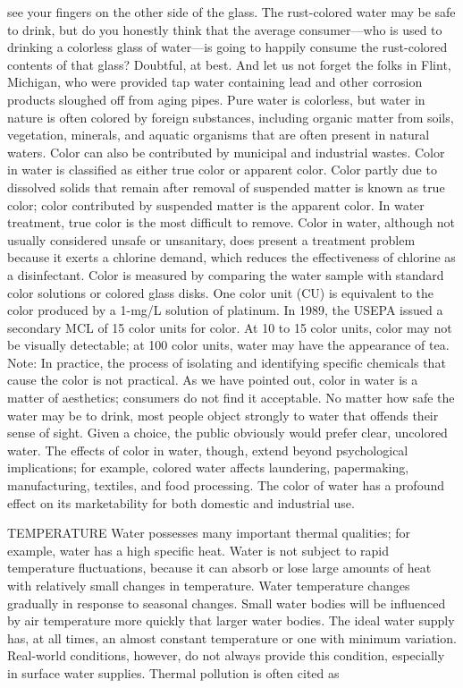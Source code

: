 \documentclass{article}
\begin{document}
see your fingers on the other side of the glass. The rust-colored water
may be safe to drink, but do you honestly think that the average
consumer---who is used to drinking a colorless glass of water---is going
to happily consume the rust-colored contents of that glass? Doubtful, at
best. And let us not forget the folks in Flint, Michigan, who were
provided tap water containing lead and other corrosion products sloughed
off from aging pipes. Pure water is colorless, but water in nature is
often colored by foreign substances, including organic matter from
soils, vegetation, minerals, and aquatic organisms that are often
present in natural waters. Color can also be contributed by municipal
and industrial wastes. Color in water is classified as either true color
or apparent color. Color partly due to dissolved solids that remain
after removal of suspended matter is known as true color; color
contributed by suspended matter is the apparent color. In water
treatment, true color is the most difficult to remove. Color in water,
although not usually considered unsafe or unsanitary, does present a
treatment problem because it exerts a chlorine demand, which reduces the
effectiveness of chlorine as a disinfectant. Color is measured by
comparing the water sample with standard color solutions or colored
glass disks. One color unit (CU) is equivalent to the color produced by
a 1-mg/L solution of platinum. In 1989, the USEPA issued a secondary MCL
of 15 color units for color. At 10 to 15 color units, color may not be
visually detectable; at 100 color units, water may have the appearance
of tea. Note: In practice, the process of isolating and identifying
specific chemicals that cause the color is not practical. As we have
pointed out, color in water is a matter of aesthetics; consumers do not
find it acceptable. No matter how safe the water may be to drink, most
people object strongly to water that offends their sense of sight. Given
a choice, the public obviously would prefer clear, uncolored water. The
effects of color in water, though, extend beyond psychological
implications; for example, colored water affects laundering,
papermaking, manufacturing, textiles, and food processing. The color of
water has a profound effect on its marketability for both domestic and
industrial use.

TEMPERATURE Water possesses many important thermal qualities; for
example, water has a high specific heat. Water is not subject to rapid
temperature fluctuations, because it can absorb or lose large amounts of
heat with relatively small changes in temperature. Water temperature
changes gradually in response to seasonal changes. Small water bodies
will be influenced by air temperature more quickly that larger water
bodies. The ideal water supply has, at all times, an almost constant
temperature or one with minimum variation. Real-world conditions,
however, do not always provide this condition, especially in surface
water supplies. Thermal pollution is often cited as
\end{document}
